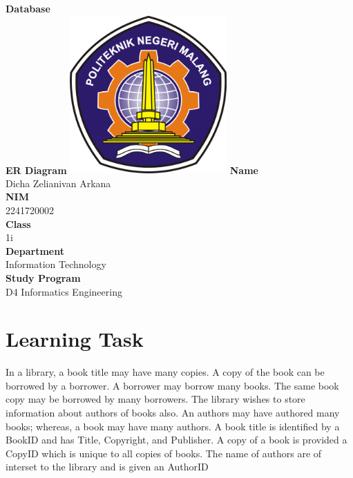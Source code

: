 \documentclass[12pt,titlepage]{article}
\newcommand{\vSubject}{Database}
\newcommand{\vSubtitle}{ER Diagram}
\newcommand{\vName}{Dicha Zelianivan Arkana}
\newcommand{\vNIM}{2241720002}
\newcommand{\vClass}{1i}
\newcommand{\vDepartment}{Information Technology}
\newcommand{\vStudyProgram}{D4 Informatics Engineering}
\begin{document}
\begin{titlepage}
    \centering
    \vfill
    {\bfseries\LARGE
        \vSubject\\
        \vskip0.25cm
        \vSubtitle
    }
    \vfill
    \includegraphics[width=6cm]{images/polinema-logo.png}
    \vfill
    {
        \textbf{Name}\\
        \vName\\
        \vskip0.5cm
        \textbf{NIM}\\
        \vNIM\\
        \vskip0.5cm
        \textbf{Class}\\
        \vClass\\
        \vskip0.5cm
        \textbf{Department}\\
        \vDepartment\\
        \vskip0.5cm
        \textbf{Study Program}\\
        \vStudyProgram
    }
\end{titlepage}

\section{Learning Task}
In a library, a book title may have many copies. A copy of the book can be borrowed by a borrower.
A borrower may borrow many books. The same book copy may be borrowed by many borrowers.
The library wishes to store information about authors of books also. An authors may
have authored many books; whereas, a book may have many authors. A book title is identified
by a BookID and has Title, Copyright, and Publisher. A copy of a book is provided a CopyID
which is unique to all copies of books. The name of authors are of interset to the library and is
given an AuthorID
\end{document}
